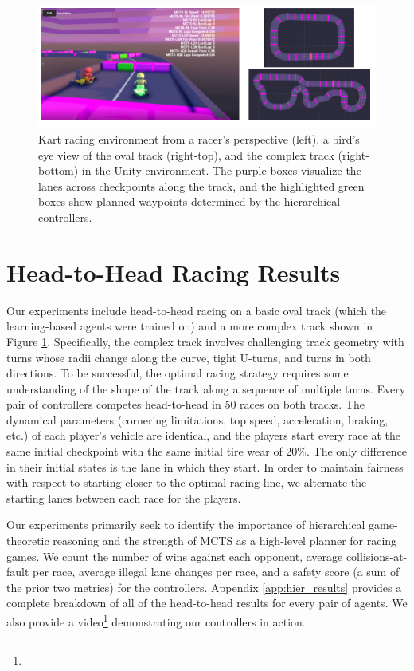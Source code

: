 \begin{figure}
  \centering
  \includegraphics[width=\textwidth]{Figures/UnityEnvironment.png}
  \caption[Screenshots of Unity simulation environment] {Kart racing environment from a racer's perspective (left), a bird's eye view of the oval track (right-top), and the complex track (right-bottom) in the Unity environment. The purple boxes visualize the lanes across checkpoints along the track, and the highlighted green boxes show planned waypoints determined by the hierarchical controllers.}
  \label{fig:experiment_tracks}
\end{figure}
\section{Head-to-Head Racing Results}
Our experiments include head-to-head racing on a basic oval track (which the learning-based agents were trained on) and a more complex track shown in Figure \ref{fig:experiment_tracks}. Specifically, the complex track involves challenging track geometry with turns whose radii change along the curve, tight U-turns, and turns in both directions. To be successful, the optimal racing strategy requires some understanding of the shape of the track along a sequence of multiple turns. Every pair of controllers competes head-to-head in 50 races on both tracks. The dynamical parameters (cornering limitations, top speed, acceleration, braking, etc.) of each player's vehicle are identical, and the players start every race at the same initial checkpoint with the same initial tire wear of 20\%. The only difference in their initial states is the lane in which they start. In order to maintain fairness with respect to starting closer to the optimal racing line, we alternate the starting lanes between each race for the players.

Our experiments primarily seek to identify the importance of hierarchical game-theoretic reasoning and the strength of MCTS as a high-level planner for racing games. We count the number of wins against each opponent, average collisions-at-fault per race, average illegal lane changes per race, and a safety score (a sum of the prior two metrics) for the controllers. Appendix \ref{app:hier_results} provides a complete breakdown of all of the head-to-head results for every pair of agents. We also provide a video\footnote{\vidurl} demonstrating our controllers in action. 

